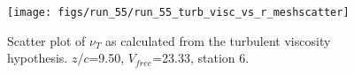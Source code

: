 \begin{figure}[H]
\centering
\texttt{[image: figs/run\_55/run\_55\_turb\_visc\_vs\_r\_meshscatter]}
\caption{Scatter plot of $\nu_T$ as calculated from the turbulent viscosity hypothesis. $z/c$=9.50, $V_{free}$=23.33, station 6.}
\label{fig:run_55_turb_visc_vs_r_meshscatter}
\end{figure}


